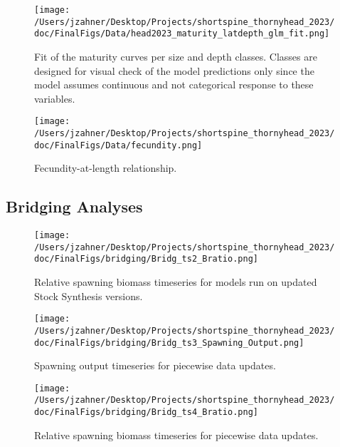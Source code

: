 \documentclass[11pt,
  english,
  letterpaper,
]{article}
\begin{document}
\begin{figure}
\centering
\texttt{[image: /Users/jzahner/Desktop/Projects/shortspine\_thornyhead\_2023/doc/FinalFigs/Data/head2023\_maturity\_latdepth\_glm\_fit.png]}
\caption{Fit of the maturity curves per size and depth classes. Classes are designed for visual check of the model predictions only since the model assumes continuous and not categorical response to these variables.\label{fig:mat1}}
\end{figure}

\begin{figure}
\centering
\texttt{[image: /Users/jzahner/Desktop/Projects/shortspine\_thornyhead\_2023/doc/FinalFigs/Data/fecundity.png]}
\caption{Fecundity-at-length relationship.\label{fig:fec}}
\end{figure}

\clearpage

\hypertarget{bridging-analyses}{%
\subsection{Bridging Analyses}\label{bridging-analyses}}

\begin{figure}
\centering
\texttt{[image: /Users/jzahner/Desktop/Projects/shortspine\_thornyhead\_2023/doc/FinalFigs/bridging/Bridg\_ts2\_Bratio.png]}
\caption{Relative spawning biomass timeseries for models run on updated Stock Synthesis versions.\label{fig:bridge_bratio}}
\end{figure}

\begin{figure}
\centering
\texttt{[image: /Users/jzahner/Desktop/Projects/shortspine\_thornyhead\_2023/doc/FinalFigs/bridging/Bridg\_ts3\_Spawning\_Output.png]}
\caption{Spawning output timeseries for piecewise data updates.\label{fig:bridge_spawnout_data}}
\end{figure}

\begin{figure}
\centering
\texttt{[image: /Users/jzahner/Desktop/Projects/shortspine\_thornyhead\_2023/doc/FinalFigs/bridging/Bridg\_ts4\_Bratio.png]}
\caption{Relative spawning biomass timeseries for piecewise data updates.\label{fig:bridge_bratio_data}}
\end{figure}

\clearpage
\end{document}
